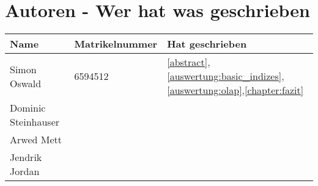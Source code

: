 \chapter{Autoren - Wer hat was geschrieben}
\begin{table}[H]
    \centering
    \begin{tabularx}{\textwidth}{llX}
    \toprule
	Name                &	Matrikelnummer  & Hat geschrieben \\
    \toprule
    Simon Oswald        &   6594512         & \autoref{abstract},\autoref{auswertung:basic_indizes},\autoref{auswertung:olap},\autoref{chapter:fazit} \\
    Dominic Steinhauser &                   & \\
    Arwed Mett          &                   & \\
    Jendrik Jordan      &                   & \\
    \bottomrule
    \end{tabularx}
    \label{tab:autoren}
\end{table}